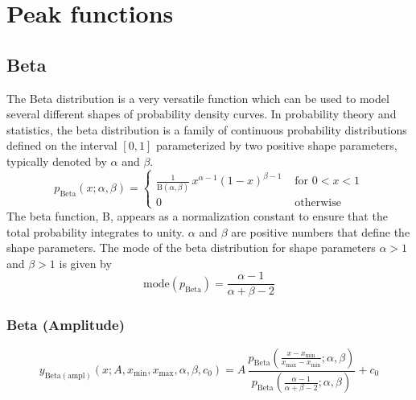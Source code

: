 \chapter{Peak functions}
\label{ch:peaks}

\clearpage
\section{Beta} \hspace{1pt}
\label{sec:Beta}
The Beta distribution is a very versatile function which can be
used to model several different shapes of probability density curves.
In probability theory and statistics, the beta distribution is a
family of continuous probability distributions defined on the
interval $[0, 1]$ parameterized by two positive shape parameters,
typically denoted by $\alpha$ and $\beta$.
\begin{equation}
p_\mathrm{Beta}(x;\alpha,\beta) =
\begin{cases}
 \frac{1}{\mathrm{B}(\alpha,\beta)}\, x ^{\alpha-1}(1-x)^{\beta-1} & \mbox{ for } 0<x<1  \\
0   & \mbox{ otherwise }
\end{cases}
\end{equation}
The beta function, B, appears as a normalization constant to ensure that the total
probability integrates to unity. $\alpha$ and $\beta$ are positive numbers that
define the shape parameters. The mode of the beta distribution for shape parameters
$\alpha>1$ and $\beta>1$ is given by
\begin{equation}
\text{mode}\left(p_\mathrm{Beta}\right) = \frac{\alpha-1}{\alpha+\beta-2}
\end{equation}

\vspace{5mm}

\subsection{Beta (Amplitude)} \hspace{1pt}
\label{sec:BetaAmplitude}
\begin{equation}
y_\mathrm{Beta (ampl)}\left(x;A,x_\mathrm{min},x_\mathrm{max},\alpha,\beta,c_0\right)
= A\, \frac{p_\mathrm{Beta}\left(\frac{x-x_\mathrm{min}}{x_\mathrm{max}-x_\mathrm{min}};\alpha,\beta\right)}{p_\mathrm{Beta}\left(\frac{\alpha-1}{\alpha+\beta-2};\alpha,\beta\right)}
+c_0
\end{equation}

